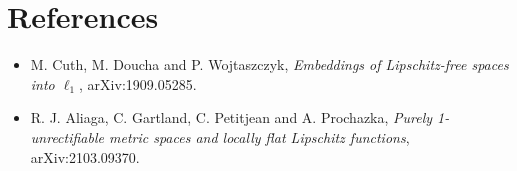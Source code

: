 \documentclass[11pt]{article}
\begin{document}
\section{References}

\begin{itemize}[leftmargin=*]
\item M. Cuth, M. Doucha and P. Wojtaszczyk, \emph{Embeddings of
Lipschitz-free spaces into \(\ell_1\)}, arXiv:1909.05285.
\item R. J. Aliaga, C. Gartland, C. Petitjean and A. Prochazka, \emph{Purely
1-unrectifiable metric spaces and locally flat Lipschitz functions},
arXiv:2103.09370.
\end{itemize}
\end{document}

